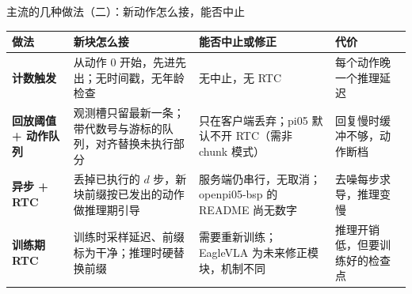 \begin{frame}[t]{主流的几种做法（二）：新动作怎么接，能否中止}
\scriptsize
\renewcommand{\arraystretch}{1.12}
\setlength{\tabcolsep}{3pt}
\begin{tabularx}{\textwidth}{>{\bfseries}p{2.3cm} Y Y p{3.0cm}}
\toprule
{}
做法 & 新块怎么接 & 能否中止或修正 & 代价 \\
\midrule
计数触发 & 从动作 0 开始，先进先出；无时间戳，无年龄检查 & 无中止，无 RTC & 每个动作晚一个推理延迟 \\
回放阈值 + 动作队列 & 观测槽只留最新一条；带代数号与游标的队列，对齐替换未执行部分 & 只在客户端丢弃；pi05 默认不开 RTC（需非 chunk 模式） & 回复慢时缓冲不够，动作断档 \\
异步 + RTC & 丢掉已执行的 $d$ 步，新块前缀按已发出的动作做推理期引导 & 服务端仍串行，无取消；openpi05-bsp 的 README 尚无数字 & 去噪每步求导，推理变慢 \\
训练期 RTC & 训练时采样延迟、前缀标为干净；推理时硬替换前缀 & 需要重新训练；EagleVLA 为未来修正模块，机制不同 & 推理开销低，但要训练好的检查点 \\
\bottomrule
\end{tabularx}
\par{}
\par{}
\end{frame}

